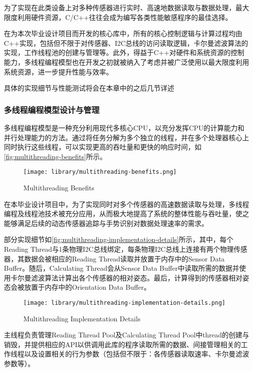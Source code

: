 为了实现在此类设备上对多种传感器进行实时、高速地数据读取与数据处理，最大限度利用硬件资源，C/C++往往会成为编写各类性能敏感程序的最佳选择。

在为本次毕业设计项目而开发的核心库中，所有的核心控制逻辑与计算过程均由C++实现，包括但不限于对传感器、I2C总线的访问读取逻辑，卡尔曼滤波算法的实现，工作线程池的创建与管理等。此外，得益于C++对硬件和系统资源的控制能力，多线程编程模型也在开发之初就被纳入了考虑并被广泛使用以最大限度利用系统资源，进一步提升性能与效率。

具体的实现细节与性能测试将会在本章中的之后几节详述
\subsubsection{多线程编程模型设计与管理}
多线程编程模型是一种充分利用现代多核心CPU，以充分发挥CPU的计算能力和并行处理能力的方法。通过将任务分解为多个独立的线程，并在多个处理器核心上同时执行这些线程，可以实现更高的吞吐量和更快的响应时间，如\autoref{fig:multithreading-benefits}所示。

\begin{figure}[H]
    \centering
    \texttt{[image: library/multithreading-benefits.png]}
    \caption{\label{fig:multithreading-benefits}Multithreading Benefits}
\end{figure}

在本毕业设计项目中，为了实现同时对多个传感器的高速数据读取与处理，多线程编程及线程池技术被充分应用，从而极大地提高了系统的整体性能与吞吐量，使之能够满足后续的动态传感器追踪与手势识别对数据处理速率的需求。

部分实现细节如\autoref{fig:multithreading-implementation-details}所示，其中，每个Reading Thread与1条物理I2C总线绑定，每条物理I2C总线上连接有两个物理传感器，其数据会被相应的Reading Thread读取并放置于内存中的Sensor Data Buffer。随后，Calculating Thread会从Sensor Data Buffer中读取所需的数据并使用卡尔曼滤波算法计算出各个传感器的相对姿态。最后，计算得到的传感器相对姿态会被放置于内存中的Orientation Data Buffer。

\begin{figure}[H]
    \centering
    \texttt{[image: library/multithreading-implementation-details.png]}
    \caption{\label{fig:multithreading-implementation-details}Multithreading Implementation Details}
\end{figure}

主线程负责管理Reading Thread Pool及Calculating Thread Pool中thread的创建与销毁，并提供相应的API以供调用此库的程序读取所需的数据、间接管理相关的工作线程以及设置相关的行为参数（包括但不限于：各传感器读取速率、卡尔曼滤波参数等）。

